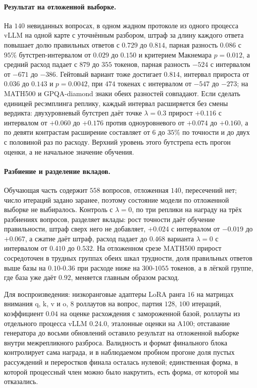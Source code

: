\documentclass[11pt]{article}
\begin{document}
\paragraph{Результат на отложенной выборке.} На $140$ невиданных вопросах, в одном жадном протоколе из одного процесса vLLM на одной карте с уточнённым разбором, штраф за длину каждого ответа повышает долю правильных ответов с $0.729$ до $0.814$, парная разность $0.086$ с $95\%$ бутстреп-интервалом от $0.029$ до $0.150$ и критерием Макнемара $p=0.012$, а средний расход падает с $879$ до $355$ токенов, парная разность $-524$ с интервалом от $-671$ до $-386$. Гейтовый вариант тоже достигает $0.814$, интервал прироста от $0.036$ до $0.143$ и $p=0.0042$, при $474$ токенах с интервалом от $-547$ до $-273$; на MATH500 и GPQA-diamond знаки обеих разностей совпадают. Если сделать единицей ресэмплинга реплику, каждый интервал расширяется без смены вердикта: двухуровневый бутстреп даёт точке $\lambda=0.3$ прирост $+0.116$ с интервалом от $+0.060$ до $+0.176$ против одноуровневого от $+0.074$ до $+0.160$, а по девяти контрастам расширение составляет от $6$ до $35\%$ по точности и до двух с половиной раз по расходу. Верхний уровень этого бутстрепа есть прогон оценки, а не начальное значение обучения.

\paragraph{Разбиение и разделение вкладов.} Обучающая часть содержит $558$ вопросов, отложенная $140$, пересечений нет; число итераций задано заранее, поэтому состояние модели по отложенной выборке не выбиралось. Контроль с $\lambda=0$, по три реплики на награду на трёх разбиениях вопросов, разделяет вклады: рост точности даёт обучение правильности, штраф сверх него не добавляет, $+0.024$ с интервалом от $-0.019$ до $+0.067$, а сжатие даёт штраф, расход падает до $0.468$ варианта $\lambda=0$ с интервалом от $0.410$ до $0.532$. На отложенном срезе MATH500 прирост сосредоточен в трудных группах обеих шкал трудности, доля правильных ответов выше базы на $0.10$-$0.36$ при расходе ниже на $300$-$1055$ токенов, а в лёгкой группе, где база уже даёт $0.92$, меняется главным образом расход.

Для воспроизведения: низкоранговые адаптеры LoRA ранга $16$ на матрицах внимания q, k, v и o, $8$ роллаутов на вопрос, партия $128$, $100$ итераций, коэффициент $0.04$ на оценке расхождения с замороженной базой, роллауты из отдельного процесса vLLM $0.24.0$, эталонные оценки на A100; отставание генератора до восьми обновлений оставило результат на отложенной выборке внутри межрепликного разброса. Валидность и формат финального блока контролирует сама награда, и в наблюдаемом пробном прогоне доля пустых рассуждений и переростков финала осталась нулевой; единственная форма, в которой процессный член можно было накрутить, есть форма, от которой мы отказались.
\end{document}
